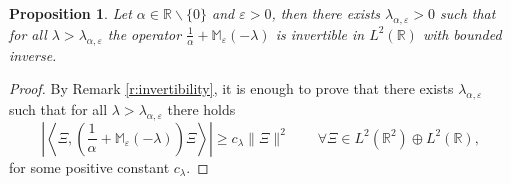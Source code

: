 \documentclass[a4paper,11pt,reqno]{amsart}
\newtheorem{proposition}[theorem]{Proposition}
\theoremstyle{definition}
\numberwithin{equation}{section}
\newcommand{\RE}{\mathbb R}
\newcommand{\Mb}{\mathbb M}
\newcommand{\ve}{\varepsilon}
\begin{document}
\begin{proposition}\label{p:invertibility}
Let $\alpha   \in \RE\backslash\{0\}$ and $\ve>0$, then there exists $\lambda_{\alpha,\ve}>0$  such that for all $\lambda > \lambda_{\alpha,\ve}$ the  operator $\frac1{\alpha }+\Mb_{ \ve}(-\lambda)$ is invertible in $L^2(\RE)$ with bounded inverse.  
\end{proposition}
\begin{proof} 
By Remark \ref{r:invertibility}, it is enough to prove that there exists $\lambda_{\alpha,\ve}$ such that  for all $\lambda>\lambda_{\alpha,\ve}$ there holds 
\begin{equation*}%
\left|\left\langle\Xi, \left(\frac1{\alpha }+\Mb_{ \ve}(-\lambda)\right)\Xi\right\rangle\right| \geq c_\lambda \|\Xi\|^2 \qquad \forall  \Xi\in L^2(\RE^2)\oplus L^2(\RE),
\end{equation*}
for some positive constant $c_\lambda$.
 

\end{proof}
\end{document}
